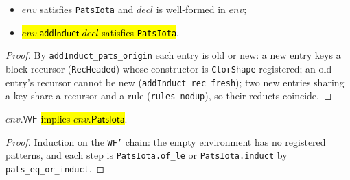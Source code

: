 \begin{theorem}
\label{thm:indparams-patsiota-induct}
\leanok
{} 
\begin{itemize}
\item {} $env$ satisfies \texttt{PatsIota} and $decl$ is well-formed in $env$;
\item {} \hl{$env.\mathsf{addInduct}\;decl$ satisfies \texttt{PatsIota}}.
\end{itemize}
\end{theorem}
\begin{proof}
\leanok
{} By \texttt{addInduct\_pats\_origin} each entry is old or new: a new entry keys a
block recursor (\texttt{RecHeaded}) whose constructor is \texttt{CtorShape}-registered; an
old entry's recursor cannot be new (\texttt{addInduct\_rec\_fresh}); two new entries sharing
a key share a recursor and a rule (\texttt{rules\_nodup}), so their reducts coincide.
\end{proof}

\begin{theorem}
\label{thm:indparams-wf-patsiota}
\leanok
{} 

 $env.\mathsf{WF}$ \hl{implies $env.\mathsf{PatsIota}$}.
\end{theorem}
\begin{proof}
\leanok
{} Induction on the \texttt{WF'} chain: the empty environment has no registered
patterns, and each step is \texttt{PatsIota.of\_le} or \texttt{PatsIota.induct} by
\texttt{pats\_eq\_or\_induct}.
\end{proof}

